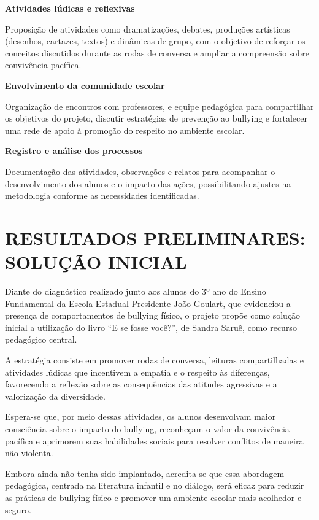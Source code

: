 		
		\textbf{Atividades lúdicas e reflexivas}
		
		Proposição de atividades como dramatizações, debates, produções artísticas (desenhos, cartazes, textos) e dinâmicas de grupo, com o objetivo de reforçar os conceitos discutidos durante as rodas de conversa e ampliar a compreensão sobre convivência pacífica.
		
		\textbf{Envolvimento da comunidade escolar}
		
		Organização de encontros com professores, e equipe pedagógica para compartilhar os objetivos do projeto, discutir estratégias de prevenção ao bullying e fortalecer uma rede de apoio à promoção do respeito no ambiente escolar.
		
		\textbf{Registro e análise dos processos}
		
		Documentação das atividades, observações e relatos para acompanhar o desenvolvimento dos alunos e o impacto das ações, possibilitando ajustes na metodologia conforme as necessidades identificadas.
	
	
	\section{RESULTADOS PRELIMINARES: SOLUÇÃO INICIAL} %
	
		Diante do diagnóstico realizado junto aos alunos do 3º ano do Ensino Fundamental da Escola Estadual Presidente João Goulart, que evidenciou a presença de comportamentos de bullying físico, o projeto propõe como solução inicial a utilização do livro “E se fosse você?”, de Sandra Saruê, como recurso pedagógico central.
		
		A estratégia consiste em promover rodas de conversa, leituras compartilhadas e atividades lúdicas que incentivem a empatia e o respeito às diferenças, favorecendo a reflexão sobre as consequências das atitudes agressivas e a valorização da diversidade.
		
		Espera-se que, por meio dessas atividades, os alunos desenvolvam maior consciência sobre o impacto do bullying, reconheçam o valor da convivência pacífica e aprimorem suas habilidades sociais para resolver conflitos de maneira não violenta.
		
		Embora ainda não tenha sido implantado, acredita-se que essa abordagem pedagógica, centrada na literatura infantil e no diálogo, será eficaz para reduzir as práticas de bullying físico e promover um ambiente escolar mais acolhedor e seguro.





